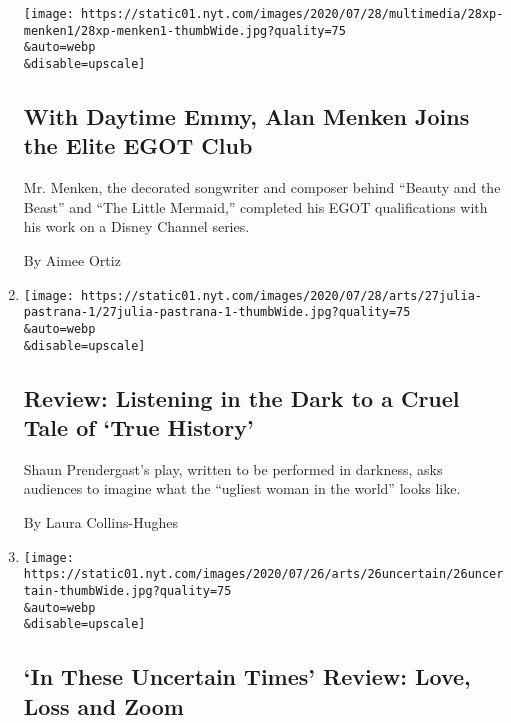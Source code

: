 \begin{enumerate}
  \texttt{[image: https://static01.nyt.com/images/2020/07/28/multimedia/28xp-menken1/28xp-menken1-thumbWide.jpg?quality=75\\\&auto=webp\\\&disable=upscale]}

  \hypertarget{with-daytime-emmy-alan-menken-joins-the-elite-egot-club}{%
  \subsection{With Daytime Emmy, Alan Menken Joins the Elite EGOT
  Club}\label{with-daytime-emmy-alan-menken-joins-the-elite-egot-club}}

  Mr. Menken, the decorated songwriter and composer behind ``Beauty and
  the Beast'' and ``The Little Mermaid,'' completed his EGOT
  qualifications with his work on a Disney Channel series.

  By Aimee Ortiz
\item
  \href{/2020/07/27/theater/true-history-julia-pastrana-review.html}{}

  \texttt{[image: https://static01.nyt.com/images/2020/07/28/arts/27julia-pastrana-1/27julia-pastrana-1-thumbWide.jpg?quality=75\\\&auto=webp\\\&disable=upscale]}

  \hypertarget{review-listening-in-the-dark-to-a-cruel-tale-of-true-history}{%
  \subsection{Review: Listening in the Dark to a Cruel Tale of `True
  History'}\label{review-listening-in-the-dark-to-a-cruel-tale-of-true-history}}

  Shaun Prendergast's play, written to be performed in darkness, asks
  audiences to imagine what the ``ugliest woman in the world'' looks
  like.

  By Laura Collins-Hughes
\item
  \href{/2020/07/26/theater/in-these-uncertain-times-review.html}{}

  \texttt{[image: https://static01.nyt.com/images/2020/07/26/arts/26uncertain/26uncertain-thumbWide.jpg?quality=75\\\&auto=webp\\\&disable=upscale]}

  \hypertarget{in-these-uncertain-times-review-love-loss-and-zoom}{%
  \subsection{`In These Uncertain Times' Review: Love, Loss and
  Zoom}\label{in-these-uncertain-times-review-love-loss-and-zoom}}


\end{enumerate}
